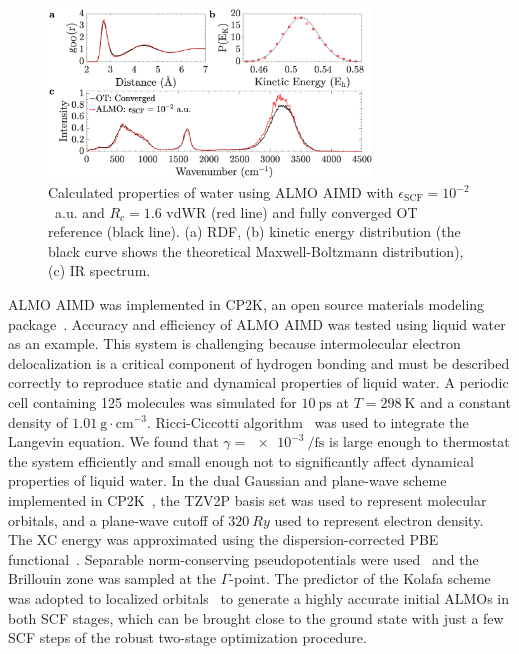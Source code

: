 \documentclass[aps,prl,reprint,amsmath,amssymb]{revtex4-1}
\begin{document}
\begin{figure}
\includegraphics[trim={1.3cm 0.1cm 3.3cm 1.3cm},clip,width=8.6cm]{Dynamical_Data_Tiled.eps}
\caption{\label{fig:dynproperties} 
Calculated properties of water using ALMO AIMD with $\epsilon_{\text{SCF}} = 10^{-2}$~a.u. and $R_{c} = 1.6$ vdWR (red line) and fully converged OT reference (black line).
(a) RDF, 
(b) kinetic energy distribution (the black curve shows the theoretical Maxwell-Boltzmann distribution), 
(c) IR spectrum.
}
\end{figure}

ALMO AIMD was implemented in CP2K, an open source materials modeling package~\cite{www:cp2k}. 
Accuracy and efficiency of ALMO AIMD was tested using liquid water as an example. 
This system is challenging because intermolecular electron delocalization is a critical component of hydrogen bonding and must be described correctly to reproduce static and dynamical properties of liquid water. 
A periodic cell containing 125 molecules was simulated for $\SI{10}{\ps}$ at $T=\SI{298}{\K}$ and a constant density of $\SI{1.01}{\g\cdot\cm^{-3}}$. 
Ricci-Ciccotti algorithm~\cite{Ricci2003} was used to integrate the Langevin equation. We found that $\gamma = \SI{e-3}{\per\fs}$ is large enough to thermostat the system efficiently and small enough not to significantly affect dynamical properties of liquid water.
%
In the dual Gaussian and plane-wave scheme implemented in CP2K~\cite{a:quickstep}, the TZV2P basis set was used to represent molecular orbitals, and a plane-wave cutoff of $\SI{320}{Ry}$ used to represent electron density. 
The XC energy was approximated using the dispersion-corrected PBE functional~\cite{a:PBEfunctional,Grimme2010}. 
Separable norm-conserving pseudopotentials were used~\cite{a:hgh} and the Brillouin zone was sampled at the $\Gamma$-point. 
%
The predictor of the Kolafa scheme~\cite{Kolafa2003} was adopted to localized orbitals~\cite{a:2ndcpmd} to generate a highly accurate initial ALMOs in both SCF stages, which can be brought close to the ground state with just a few SCF steps of the robust two-stage optimization procedure. 
\end{document}
